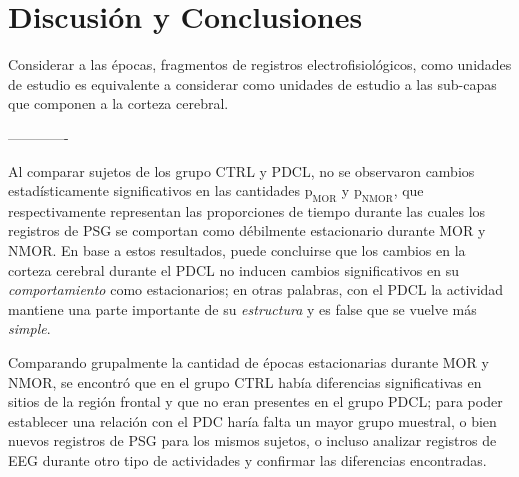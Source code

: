 


\chapter{Discusión y Conclusiones}

Considerar a las épocas, fragmentos de registros electrofisiológicos, como unidades de estudio es equivalente a considerar como unidades de estudio a las sub-capas que componen a la corteza cerebral.

-------------

Al comparar sujetos de los grupo CTRL y PDCL, no se observaron cambios estadísticamente significativos en las cantidades $\text{p}_{\text{MOR}}$ y $\text{p}_{\text{NMOR}}$, que respectivamente representan las proporciones de tiempo durante las cuales los registros de PSG se comportan como débilmente estacionario durante MOR y NMOR. 
%
En base a estos resultados, puede concluirse que los cambios en la corteza cerebral durante el PDCL no inducen cambios significativos en su \textit{comportamiento} como estacionarios;
en otras palabras, con el PDCL la actividad mantiene una parte importante de su \textit{estructura} y es false que se vuelve más \textit{simple}.


Comparando grupalmente la cantidad de épocas estacionarias durante MOR y NMOR, se encontró que en 
el grupo CTRL había diferencias significativas en sitios de la región frontal y que no eran presentes
en el grupo PDCL; para poder establecer una relación con el PDC haría falta un mayor grupo muestral, 
o bien nuevos registros de PSG para los mismos sujetos, o incluso analizar registros de EEG durante 
otro tipo de actividades y confirmar las diferencias encontradas.

